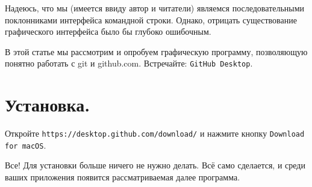\documentclass[12pt,a4paper]{article}
\begin{document}
Надеюсь, что мы (имеется ввиду автор и читатели) являемся последовательными поклонниками
интерфейса командной строки. Однако, отрицать существование графического интерфейса было бы
глубоко ошибочным.

В этой статье мы рассмотрим и опробуем графическую программу, позволяющую понятно работать
с git и github.com. Встречайте: \texttt{GitHub Desktop}.

\section{Установка.}
Откройте \texttt{https://desktop.github.com/download/} и нажмите кнопку \texttt{Download for macOS}.

Все! Для установки больше ничего не нужно делать. Всё само сделается, и среди ваших приложения
появится рассматриваемая далее программа.
\end{document}
